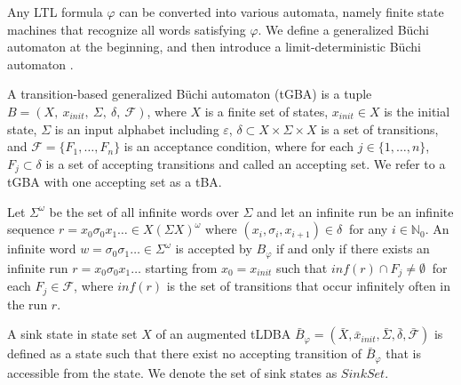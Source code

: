 \begin{definition}
\label{def5}
\end{definition}

Any LTL formula $\varphi$ can be converted into various automata, namely finite state machines that recognize %
all words satisfying $\varphi$.
 We define a generalized B\"{u}chi automaton at the beginning, and then introduce a limit-deterministic B\"{u}chi automaton \cite{HKAKPL2019}.

 \begin{definition}
   A transition-based generalized B\"{u}chi automaton (tGBA) is a tuple $B = (X,\ x_{init},\ \Sigma,\ \delta,\ \mathcal{F})$, where $X$ is a finite set of states, $x_{init} \in X$ is the initial state, $\Sigma$ is an input alphabet including $\varepsilon$, $\delta \subset  X\times \Sigma \times X$ is a set of transitions, and $\mathcal{F} = \{F_1,\ldots,F_n\}$ is an acceptance condition, where for each $ j \in \{1,\ldots,n\}$, $F_j \subset \delta$ is a set of accepting transitions and called an accepting set. We refer to a tGBA with one accepting set as a tBA.

   Let $\Sigma^{\omega}$ be the set of all infinite words over $\Sigma$ and let an infinite run be an infinite sequence $r = x_0\sigma_0x_1 \ldots \in X (\Sigma X)^{\omega}$ where $(x_i, \sigma_{i}, x_{i+1}) \in \delta\ $ for any $ i\in \mathbb{N}_0$. An infinite word $w = \sigma_0\sigma_1 \ldots \in \Sigma^{\omega}$ is accepted by $B_{\varphi}$ if and only if there exists an infinite run $r = x_0 \sigma_0 x_1 \ldots$ starting from $x_0 = x_{init}$ such that $inf(r) \cap F_j \neq \emptyset\ $ for each $F_j \in \mathcal{F}$, where $inf(r)$ is the set of transitions that occur infinitely often in the run $r$.
 \end{definition}

\begin{definition}
A sink state in state set $X$ of an augmented tLDBA $\bar{B}_{\varphi} = (\bar{X}, \bar{x}_{init},\bar{\Sigma},\bar{\delta},\bar{\mathcal{F}})$ is defined as a state such that there exist no accepting transition of $\bar{B}_{\varphi}$ that is accessible from the state. We denote the set of sink states as $Sink Set$.
\end{definition}

